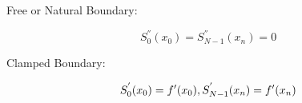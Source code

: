 \documentclass[12pt]{article}
\newcommand{\1}{\mathbbm 1}
\begin{document}
		
		Free or Natural Boundary: 
		
		\begin{equation}
			S_{0}^{''}(x_{0}) = S_{N-1}^{''}(x_{n}) = 0
		\end{equation}
		
		Clamped Boundary:  
		
		\begin{equation}
			S_{0}^{'}(x_{0}) = f'(x_{0}), \\ S_{N-1}^{'}(x_{n}) = f'(x_{n})
		\end{equation}
	
	
		
		
		
		
		
		
		
	
		
\end{document}
